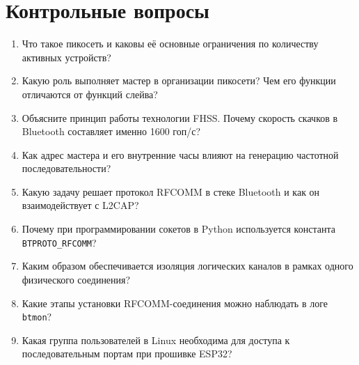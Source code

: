 \section*{Контрольные вопросы}
\begin{enumerate}[nosep, leftmargin=*]
    \item Что такое пикосеть и каковы её основные ограничения по количеству активных устройств?
    \item Какую роль выполняет мастер в организации пикосети? Чем его функции отличаются от функций слейва?
    \item Объясните принцип работы технологии FHSS. Почему скорость скачков в Bluetooth составляет именно 1600 гоп/с?
    \item Как адрес мастера и его внутренние часы влияют на генерацию частотной последовательности?
    \item Какую задачу решает протокол RFCOMM в стеке Bluetooth и как он взаимодействует с L2CAP?
    \item Почему при программировании сокетов в Python используется константа \texttt{BTPROTO\_RFCOMM}?
    \item Каким образом обеспечивается изоляция логических каналов в рамках одного физического соединения?
    \item Какие этапы установки RFCOMM-соединения можно наблюдать в логе \texttt{btmon}?
    \item Какая группа пользователей в Linux необходима для доступа к последовательным портам при прошивке ESP32?
\end{enumerate}
